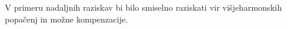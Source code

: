\documentclass[a4paper,twoside,openright,12pt,slovene]{book}
\begin{document}
V primeru nadaljnih raziskav bi bilo smiselno raziskati vir višjeharmonskih popačenj in možne kompenzacije.

\cleardoublepage{} %






\end{document}
